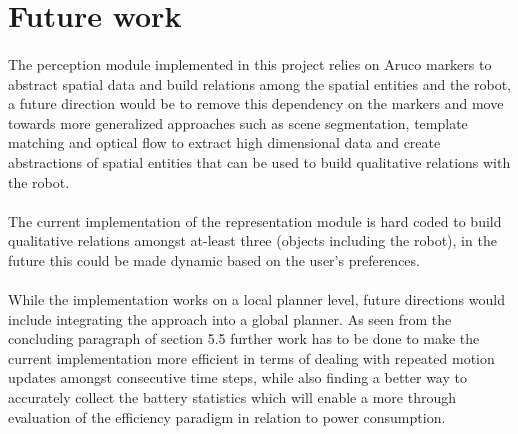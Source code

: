 \section{Future work}
\paragraph{} The perception module implemented in this project relies on Aruco markers to abstract spatial data and build relations among the spatial entities and the robot, a future direction would be to remove this dependency on the markers and move towards more generalized approaches such as scene segmentation, template matching and optical flow to extract high dimensional data and create abstractions of spatial entities that can be used to build qualitative relations with the robot. 

\paragraph{} The current implementation of the representation module is hard coded to build qualitative relations amongst at-least three (objects including the robot), in the future this could be made dynamic based on the user's preferences.

\paragraph{}While the implementation works on a local planner level, future directions would include integrating the approach into a global planner. As seen from the concluding paragraph of section 5.5 further work has to be done to make the current implementation more efficient in terms of dealing with repeated motion updates amongst consecutive time steps, while also finding a better way to accurately collect the battery statistics which will enable a more through evaluation of the efficiency paradigm in relation to power consumption.